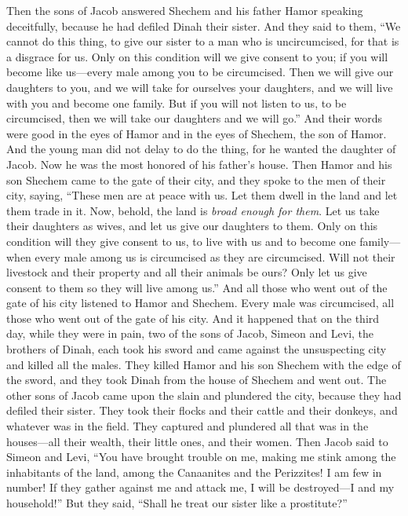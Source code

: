 \begin{biblechapter}
\verse Then the sons of Jacob answered Shechem and his father Hamor speaking deceitfully, because he had defiled Dinah their sister.
\verse And they said to them, “We cannot do this thing, to give our sister to a man who is uncircumcised, for that is a disgrace for us.
\verse Only on this condition will we give consent to you; if you will become like us—every male among you to be circumcised.
\verse Then we will give our daughters to you, and we will take for ourselves your daughters, and we will live with you and become one family.
\verse But if you will not listen to us, to be circumcised, then we will take our daughters and we will go.”
\verse And their words were good in the eyes of Hamor and in the eyes of Shechem, the son of Hamor.
\verse And the young man did not delay to do the thing, for he wanted the daughter of Jacob. Now he was the most honored of his father’s house.
\verse Then Hamor and his son Shechem came to the gate of their city, and they spoke to the men of their city, saying,
\verse “These men are at peace with us. Let them dwell in the land and let them trade in it. Now, behold, the land is \textit{broad enough for them}. Let us take their daughters as wives, and let us give our daughters to them.
\verse Only on this condition will they give consent to us, to live with us and to become one family—when every male among us is circumcised as they are circumcised.
\verse Will not their livestock and their property and all their animals be ours? Only let us give consent to them so they will live among us.”
\verse And all those who went out of the gate of his city listened to Hamor and Shechem. Every male was circumcised, all those who went out of the gate of his city.
\verse And it happened that on the third day, while they were in pain, two of the sons of Jacob, Simeon and Levi, the brothers of Dinah, each took his sword and came against the unsuspecting city and killed all the males.
\verse They killed Hamor and his son Shechem with the edge of the sword, and they took Dinah from the house of Shechem and went out.
\verse The other sons of Jacob came upon the slain and plundered the city, because they had defiled their sister.
\verse They took their flocks and their cattle and their donkeys, and whatever was in the field.
\verse They captured and plundered all that was in the houses—all their wealth, their little ones, and their women.
\verse Then Jacob said to Simeon and Levi, “You have brought trouble on me, making me stink among the inhabitants of the land, among the Canaanites and the Perizzites! I am few in number! If they gather against me and attack me, I will be destroyed—I and my household!”
\verse But they said, “Shall he treat our sister like a prostitute?”
\end{biblechapter}

